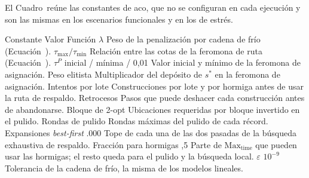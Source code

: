 \startsubsection[title={Constantes de la implementación}, reference=sec:calib_aco_constantes]

El Cuadro~ reúne las constantes de \ac{aco}, que no
se configuran en cada ejecución y son las mismas en los escenarios
funcionales y en los de estrés.

\startplacetable[reference=tab:aco_constantes, location=here, title={Constantes de implementación de \ac{aco}.}]
\bTABLE[split=yes, align=middle, frame=on, width=fit]
\setupTABLE[row][1][background=color, backgroundcolor=darkgray, style=bold]
\setupTABLE[column][2][align=flushright]
\setupTABLE[column][3][width=8cm, align=flushleft]
\bTR \bTH Constante \eTH \bTH Valor \eTH \bTH Función \eTH \eTR
\bTR \bTD $\lambda$ \eTD {} \eTD \bTD Peso de la penalización por cadena de frío (Ecuación~\in[eq:hc_costo]). \eTD \eTR
\bTR \bTD $\tau_{\max} / \tau_{\min}$ \eTD {} \eTD \bTD Relación entre las cotas de la feromona de ruta (Ecuación~). \eTD \eTR
\bTR \bTD $\tau^{P}$ inicial / mínima \eTD {} / 0,01 \eTD \bTD Valor inicial y mínimo de la feromona de asignación. \eTD \eTR
\bTR \bTD Peso elitista \eTD {} \eTD \bTD Multiplicador del depósito de $s^*$ en la feromona de asignación. \eTD \eTR
\bTR \bTD Intentos por lote \eTD {} \eTD \bTD Construcciones por lote y por hormiga antes de usar la ruta de respaldo. \eTD \eTR
\bTR \bTD Retrocesos \eTD {} \eTD \bTD Pasos que puede deshacer cada construcción antes de abandonarse. \eTD \eTR
\bTR \bTD Bloque de 2-opt \eTD {} \eTD \bTD Ubicaciones requeridas por bloque invertido en el pulido. \eTD \eTR
\bTR \bTD Rondas de pulido \eTD {} \eTD \bTD Rondas máximas del pulido de cada récord. \eTD \eTR
\bTR \bTD Expansiones {\em best-first} \eTD {}.000 \eTD \bTD Tope de cada una de las dos pasadas de la búsqueda exhaustiva de respaldo. \eTD \eTR
\bTR \bTD Fracción para hormigas \eTD {},5 \eTD \bTD Parte de $\text{Max}_{\text{time}}$ que pueden usar las hormigas; el resto queda para el pulido y la búsqueda local. \eTD \eTR
\bTR \bTD $\varepsilon$ \eTD \bTD $10^{-9}$ \eTD \bTD Tolerancia de la cadena de frío, la misma de los modelos lineales. \eTD \eTR
\eTABLE
\stopplacetable

\stopsubsection

\startsubsection[title={Reparto del tiempo máximo}, reference=sec:calib_aco_tiempo]

